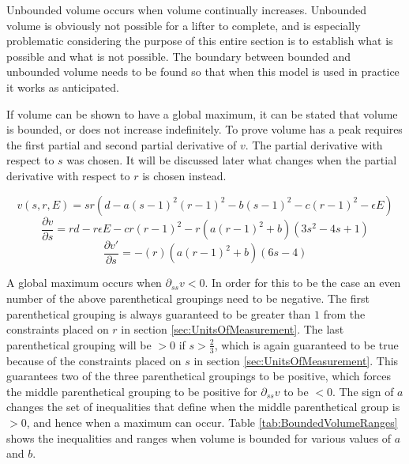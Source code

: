 Unbounded volume occurs when volume continually increases. Unbounded volume is obviously not possible for a lifter to complete, and is especially problematic considering the purpose of this entire section is to establish what is possible and what is not possible. The boundary between bounded and unbounded volume needs to be found so that when this model is used in practice it works as anticipated.

If volume can be shown to have a global maximum, it can be stated that volume is bounded, or does not increase indefinitely. To prove volume has a peak requires the first partial and second partial derivative of $v$. The partial derivative with respect to $s$ was chosen. It will be discussed later what changes when the partial derivative with respect to $r$ is chosen instead.

\begin{equation}
    \label{eq:IntensitySubedInVolume}
    v(s,r,E)=sr\left( d-a(s-1)^2(r-1)^2-b(s-1)^2-c(r-1)^2-\epsilon E \right)
\end{equation}
\begin{equation}
    \label{eq:VolumeSPartialDerivative}
    \frac{\partial v}{\partial s}=rd-r\epsilon E-cr(r-1)^2-r\left( a(r-1)^2+b \right)\left( 3s^2-4s+1 \right)
\end{equation}
\begin{equation}
    \label{eq:VolumeSSecondPartialDerivative}
    \frac{\partial v'}{\partial s}=-(r)\left( a(r-1)^2+b \right)(6s-4)
\end{equation}

A global maximum occurs when $\partial_{ss} v<0$. In order for this to be the case an even number of the above parenthetical groupings need to be negative. The first parenthetical grouping is always guaranteed to be greater than $1$ from the constraints placed on $r$ in section \ref{sec:UnitsOfMeasurement}. The last parenthetical grouping will be $>0$ if $s>\frac{2}{3}$, which is again guaranteed to be true because of the constraints placed on $s$ in section \ref{sec:UnitsOfMeasurement}. This guarantees two of the three parenthetical groupings to be positive, which forces the middle parenthetical grouping to be positive for $\partial_{ss} v$ to be $<0$. The sign of $a$ changes the set of inequalities that define when the middle parenthetical group is $>0$, and hence when a maximum can occur. Table \ref{tab:BoundedVolumeRanges} shows the inequalities and ranges when volume is bounded for various values of $a$ and $b$.

